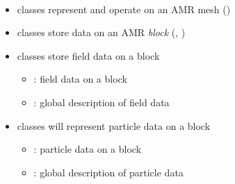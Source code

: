 \begin{frame}[fragile] 
\secframetitle{\ssComponents}
\framesubtitle{}

\begin{itemize}
\item {} classes represent and operate on an AMR mesh ()
\item {} classes store data on an AMR \textit{block} (, )
\item {} classes store field data on a block
\begin{itemize}
\item {}: field data on a block
\item {}: global description of field data
\end{itemize}
\item {} classes will represent particle data on a block
\begin{itemize}
\item {}: particle data on a block
\item {}: global description of particle data
\end{itemize}
\end{itemize}
\end{frame}


